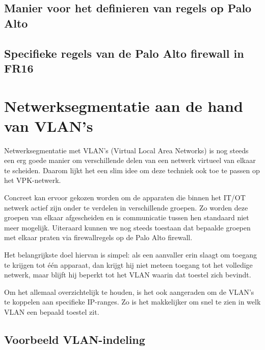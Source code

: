 \subsection{Manier voor het definieren van regels op Palo Alto}
\subsection{Specifieke regels van de Palo Alto firewall in FR16}

\section{Netwerksegmentatie aan de hand van VLAN’s}

Netwerksegmentatie met VLAN’s (Virtual Local Area Networks) is nog steeds een erg goede manier om verschillende delen van een netwerk virtueel van elkaar te scheiden. Daarom lijkt het een slim idee om deze techniek ook toe te passen op het VPK-netwerk.

\vspace{5mm}
Concreet kan ervoor gekozen worden om de apparaten die binnen het IT/OT netwerk actief zijn onder te verdelen in verschillende groepen. Zo worden deze groepen van elkaar afgescheiden en is communicatie tussen hen standaard niet meer mogelijk. Uiteraard kunnen we nog steeds toestaan dat bepaalde groepen met elkaar praten via firewallregels op de Palo Alto firewall.

\vspace{5mm}
Het belangrijkste doel hiervan is simpel: als een aanvaller erin slaagt om toegang te krijgen tot één apparaat, dan krijgt hij niet meteen toegang tot het volledige netwerk, maar blijft hij beperkt tot het VLAN waarin dat toestel zich bevindt.

\vspace{5mm}
Om het allemaal overzichtelijk te houden, is het ook aangeraden om de VLAN’s te koppelen aan specifieke IP-ranges. Zo is het makkelijker om snel te zien in welk VLAN een bepaald toestel zit.

\subsection*{Voorbeeld VLAN-indeling}

